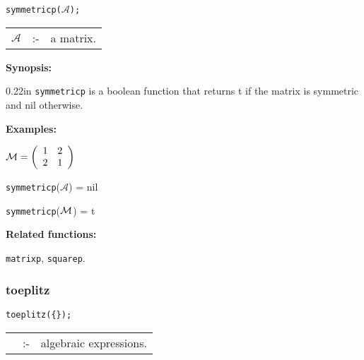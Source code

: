 
\hspace*{0.175in} {\tt symmetricp($\mathcal{A}$);}

\hspace*{0.1in}  
\begin{tabular}{l l l} 
$\mathcal{A}$ &:-& a matrix. 
\end{tabular}

{\bf Synopsis:} %

\begin{addtolength}{\leftskip}{0.22in}
{\tt symmetricp} is a boolean function that returns t if the 
                matrix is symmetric and nil otherwise.

\end{addtolength}

{\bf Examples:}

\begin{flushleft}
\hspace*{0.175in}
\begin{math}  
{\cal M} = \left( \begin{array}{cc} 1 & 2 \\ 2 & 1 
\end{array} \right)
\end{math}  
\end{flushleft}

\vspace*{0.1in}

\hspace*{0.175in} {\tt symmetricp}($\mathcal{A}$) = nil 

\hspace*{0.175in} {\tt symmetricp}(${\cal M}$) = t

{\bf Related functions:}

\hspace*{0.175in} {\tt matrixp}, {\tt squarep}.


\subsubsection{toeplitz}
\label{linalg:toeplitz}

\hspace*{0.175in} {\tt toeplitz(\{\exprlist{}\});} \lazyfootnote{}

\hspace*{0.1in} 
\begin{tabular}{l l l}
\exprlist{} &:-& algebraic expressions.
\end{tabular}

